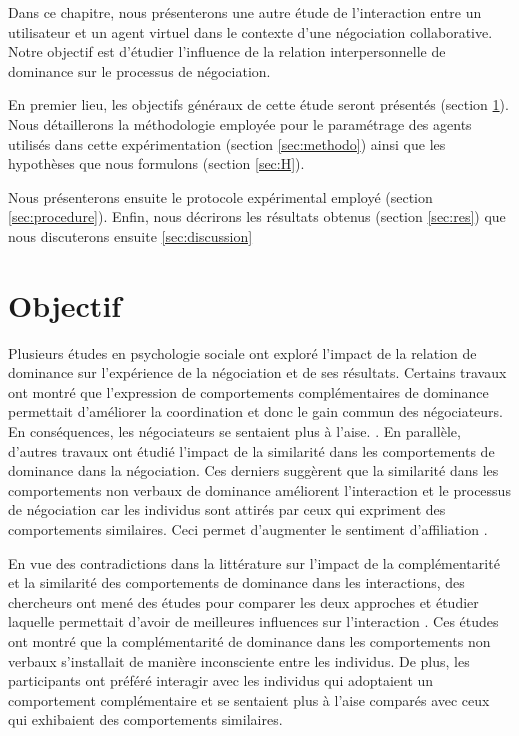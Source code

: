 
Dans ce chapitre, nous présenterons une autre étude de l'interaction entre un utilisateur et un agent virtuel dans le contexte d'une négociation collaborative. 
Notre objectif est d'étudier l'influence de la relation interpersonnelle de dominance sur le processus de négociation. 

En premier lieu, les objectifs généraux de cette étude seront présentés (section \ref{sec:obj}). Nous détaillerons la méthodologie employée pour le paramétrage des agents utilisés dans cette expérimentation (section \ref{sec:methodo}) ainsi que les hypothèses que nous formulons (section \ref{sec:H}).

Nous présenterons ensuite le protocole expérimental employé (section \ref{sec:procedure}). Enfin, nous décrirons les résultats obtenus  (section \ref{sec:res})
que nous discuterons ensuite \ref{sec:discussion}
\section{Objectif}
\label{sec:obj}

Plusieurs études en psychologie sociale ont exploré l'impact de la relation de dominance sur l'expérience de la négociation et de ses résultats. Certains travaux ont montré que l'expression de comportements complémentaires de dominance permettait d'améliorer la coordination et donc le gain commun des négociateurs. En conséquences, les négociateurs se sentaient plus à l'aise. \cite{tiedens2003power,wiltermuth2009benefits,olekalns2013dyadic}.
En parallèle, d'autres travaux ont étudié l'impact de la similarité dans les comportements de dominance dans la négociation. Ces derniers suggèrent que la similarité dans les comportements non verbaux de dominance améliorent l'interaction et le processus de négociation car les individus sont attirés par ceux qui expriment des comportements similaires. Ceci permet d'augmenter le sentiment d'affiliation \cite{olekalns2013dyadic}. 

En vue des contradictions dans la littérature sur l'impact de la complémentarité et la similarité des comportements de dominance dans les interactions, des chercheurs ont mené des études pour comparer les deux approches et étudier laquelle permettait d'avoir de meilleures influences sur l'interaction \cite{tiedens2003power,dryer1997opposites}. Ces études ont montré que la complémentarité de dominance dans les comportements non verbaux s'installait de manière inconsciente entre les individus. De plus, les participants ont préféré interagir avec les individus qui adoptaient un comportement complémentaire et se sentaient plus à l'aise comparés avec ceux qui exhibaient des comportements similaires. 


